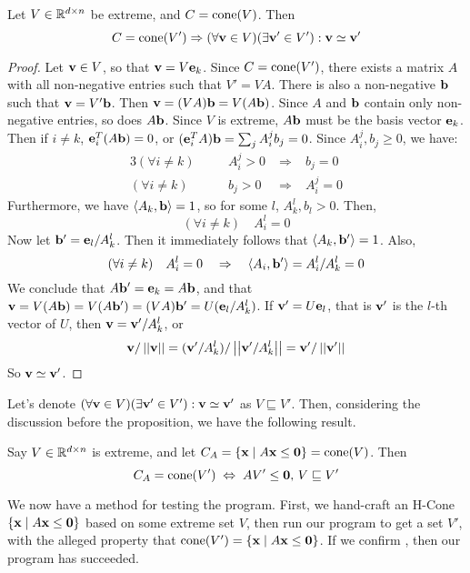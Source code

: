\begin{Prop}\label{extreme_v}
	Let $V \in \mathbb{R}^{d\times n}$ be extreme, and $C = \operatorname{cone}(V)$.  Then
	\[ C = \operatorname{cone}(V') \Rightarrow (\forall \mathbf{v} \in V)(\exists \mathbf{v}'\in V') : \mathbf{v} \simeq \mathbf{v}' \]
\end{Prop}

\begin{proof}
	Let $\mathbf{v} \in V$, so that $\mathbf{v} = V\mathbf{e}_k$.  Since $C = \operatorname{cone}(V')$, there exists a matrix $A$ with all non-negative entries such that $V' = VA$.  There is also a non-negative $\mathbf{b}$ such that $\mathbf{v} = V'\mathbf{b}$.  Then $\mathbf{v} = (VA)\mathbf{b} = V(A\mathbf{b})$.  Since $A$ and $\mathbf{b}$ contain only non-negative entries, so does $A\mathbf{b}$.  Since $V$ is extreme, $A\mathbf{b}$ must be the basis vector $\mathbf{e}_k$.  Then if $i \neq k$, $\mathbf{e}_i^T(A\mathbf{b}) = 0$, or $(\mathbf{e}_i^TA)\mathbf{b} = \sum_j A_i^j b_j = 0$.  Since $A_i^j, b_j \geq 0$, we have:
	\begin{alignat*}{3}
		(\forall i \neq k) & \quad & A_i^j > 0 \; & \Rightarrow & \; b_j = 0   \\
		(\forall i \neq k) & \quad & b_j > 0   \; & \Rightarrow & \; A_i^j = 0
	\end{alignat*}
	Furthermore, we have $\left\langle A_k, \mathbf{b} \right\rangle = 1$, so for some $l$, $A_k^l,b_l > 0$.  Then,
	\[ (\forall i \neq k)\quad A_i^l = 0 \]
	Now let $\mathbf{b}'=\mathbf{e}_l/A_k^l$.  Then it immediately follows that $\left\langle A_k, \mathbf{b}' \right\rangle = 1$.  Also,
	\[ (\forall i \neq k)\quad A_i^l = 0 \quad \Rightarrow\quad \left\langle A_i, \mathbf{b}' \right\rangle = A_i^l/A_k^l = 0\]
	We conclude that $A\mathbf{b}' = \mathbf{e}_k = A\mathbf{b}$, and that $\mathbf{v} = V(A\mathbf{b}) = V(A\mathbf{b}') = (VA)\mathbf{b}' = U(\mathbf{e}_l/A_k^l)$.  If $\mathbf{v}' = U\mathbf{e}_l$, that is $\mathbf{v}'$ is the $l$-th vector of $U$, then $\mathbf{v} = \mathbf{v}'/A_k^l$, or
	\[ \mathbf{v}/\left|\left|\mathbf{v}\right|\right| = (\mathbf{v}'/A_k^l)/\left|\left|\mathbf{v}'/A_k^l\right|\right| = \mathbf{v}'/\left|\left|\mathbf{v}'\right|\right| \]
	So $\mathbf{v} \simeq \mathbf{v}'$.
\end{proof}

Let's denote $(\forall \mathbf{v} \in V)(\exists \mathbf{v}'\in V') : \mathbf{v} \simeq \mathbf{v}'$ as $V \sqsubseteq V'$.  Then, considering the discussion before the proposition, we have the following result.

\begin{EqCriteria}\label{eq_hc_vc}
	Say $V \in \mathbb{R}^{d\times n}$ is extreme, and let $C_A = \left\{\mathbf{x}\;|\; A\mathbf{x}\leq\mathbf{0}\right\} = \operatorname{cone}(V)$.  Then
	\[ C_A = \operatorname{cone}(V') \;\Leftrightarrow\; AV'\leq\mathbf{0},\, V \sqsubseteq V' \]
\end{EqCriteria}

\begin{Test}\label{test_hc_to_vc}
	We now have a method for testing the program.  First, we hand-craft an H-Cone $\left\{\mathbf{x}\;|\; A\mathbf{x}\leq\mathbf{0}\right\}$ based on some extreme set $V$, then run our program to get a set $V'$, with the alleged property that $\operatorname{cone}(V') = \left\{\mathbf{x}\;|\; A\mathbf{x}\leq\mathbf{0}\right\}$.  If we confirm , then our program has succeeded.
\end{Test}

